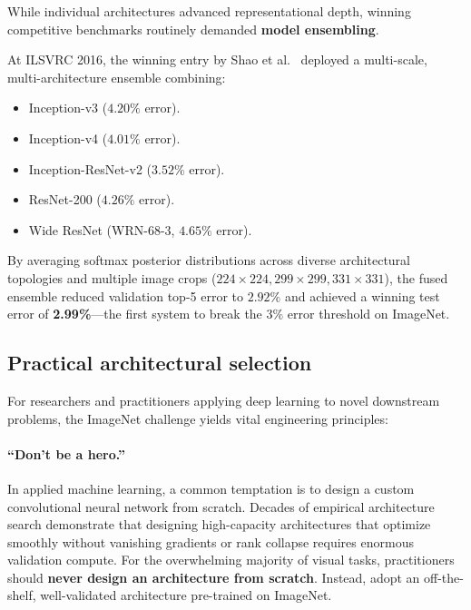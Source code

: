 While individual architectures advanced representational depth, winning competitive benchmarks routinely demanded \textbf{model ensembling}.

At ILSVRC 2016, the winning entry by Shao et al.~\cite{shao2016imagenet} deployed a multi-scale, multi-architecture ensemble combining:
\begin{itemize}[noitemsep]
  \item Inception-v3 ($4.20\%$ error).
  \item Inception-v4 ($4.01\%$ error).
  \item Inception-ResNet-v2 ($3.52\%$ error).
  \item ResNet-200 ($4.26\%$ error).
  \item Wide ResNet (WRN-68-3, $4.65\%$ error).
\end{itemize}
By averaging softmax posterior distributions across diverse architectural topologies and multiple image crops ($224 \times 224, 299 \times 299, 331 \times 331$), the fused ensemble reduced validation top-5 error to $2.92\%$ and achieved a winning test error of \textbf{2.99\%}---the first system to break the $3\%$ error threshold on ImageNet.

\subsection{Practical architectural selection}
\label{sec:practical_architecture_guidelines}

For researchers and practitioners applying deep learning to novel downstream problems, the ImageNet challenge yields vital engineering principles:

\paragraph{``Don't be a hero.''}
In applied machine learning, a common temptation is to design a custom convolutional neural network from scratch. Decades of empirical architecture search demonstrate that designing high-capacity architectures that optimize smoothly without vanishing gradients or rank collapse requires enormous validation compute. For the overwhelming majority of visual tasks, practitioners should \textbf{never design an architecture from scratch}. Instead, adopt an off-the-shelf, well-validated architecture pre-trained on ImageNet.

